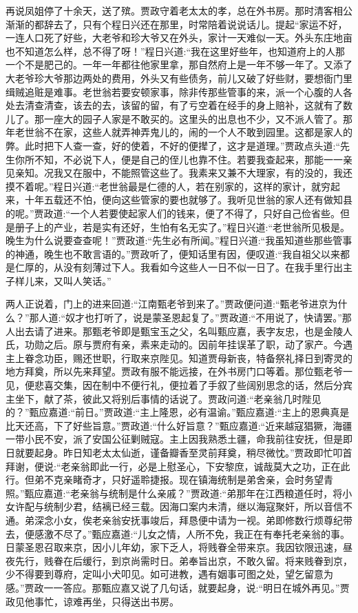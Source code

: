\begin{parag}
    再说凤姐停了十余天，送了殡。贾政守着老太太的孝，总在外书房。那时清客相公渐渐的都辞去了，只有个程日兴还在那里，时常陪着说说话儿。提起“家运不好，一连人口死了好些，大老爷和珍大爷又在外头，家计一天难似一天。外头东庄地亩也不知道怎么样，总不得了呀！”程日兴道:“我在这里好些年，也知道府上的人那一个不是肥己的。一年一年都往他家里拿，那自然府上是一年不够一年了。又添了大老爷珍大爷那边两处的费用，外头又有些债务，前儿又破了好些财，要想衙门里缉贼追赃是难事。老世翁若要安顿家事，除非传那些管事的来，派一个心腹的人各处去清查清查，该去的去，该留的留，有了亏空着在经手的身上赔补，这就有了数儿了。那一座大的园子人家是不敢买的。这里头的出息也不少，又不派人管了。那年老世翁不在家，这些人就弄神弄鬼儿的，闹的一个人不敢到园里。这都是家人的弊。此时把下人查一查，好的使着，不好的便撵了，这才是道理。”贾政点头道:“先生你所不知，不必说下人，便是自己的侄儿也靠不住。若要我查起来，那能一一亲见亲知。况我又在服中，不能照管这些了。我素来又兼不大理家，有的没的，我还摸不着呢。”程日兴道:“老世翁最是仁德的人，若在别家的，这样的家计，就穷起来，十年五载还不怕，便向这些管家的要也就够了。我听见世翁的家人还有做知县的呢。”贾政道:“一个人若要使起家人们的钱来，便了不得了，只好自己俭省些。但是册子上的产业，若是实有还好，生怕有名无实了。”程日兴道:“老世翁所见极是。晚生为什么说要查查呢！”贾政道:“先生必有所闻。”程日兴道:“我虽知道些那些管事的神通，晚生也不敢言语的。”贾政听了，便知话里有因，便叹道:“我自祖父以来都是仁厚的，从没有刻薄过下人。我看如今这些人一日不似一日了。在我手里行出主子样儿来，又叫人笑话。”
\end{parag}


\begin{parag}
    两人正说着，门上的进来回道:“江南甄老爷到来了。”贾政便问道:“甄老爷进京为什么？”那人道:“奴才也打听了，说是蒙圣恩起复了。”贾政道:“不用说了，快请罢。”那人出去请了进来。那甄老爷即是甄宝玉之父，名叫甄应嘉，表字友忠，也是金陵人氏，功勋之后。原与贾府有亲，素来走动的。因前年挂误革了职，动了家产。今遇主上眷念功臣，赐还世职，行取来京陛见。知道贾母新丧，特备祭礼择日到寄灵的地方拜奠，所以先来拜望。贾政有服不能远接，在外书房门口等着。那位甄老爷一见，便悲喜交集，因在制中不便行礼，便拉着了手叙了些阔别思念的话，然后分宾主坐下，献了茶，彼此又将别后事情的话说了。贾政问道:“老亲翁几时陛见的？”甄应嘉道:“前日。”贾政道:“主上隆恩，必有温谕。”甄应嘉道:“主上的恩典真是比天还高，下了好些旨意。”贾政道:“什么好旨意？”甄应嘉道:“近来越寇猖獗，海疆一带小民不安，派了安国公征剿贼寇。主上因我熟悉土疆，命我前往安抚，但是即日就要起身。昨日知老太太仙逝，谨备瓣香至灵前拜奠，稍尽微忱。”贾政即忙叩首拜谢，便说:“老亲翁即此一行，必是上慰圣心，下安黎庶，诚哉莫大之功，正在此行。但弟不克亲睹奇才，只好遥聆捷报。现在镇海统制是弟舍亲，会时务望青照。”甄应嘉道:“老亲翁与统制是什么亲戚？”贾政道:“弟那年在江西粮道任时，将小女许配与统制少君，结褵已经三载。因海口案内未清，继以海寇聚奸，所以音信不通。弟深念小女，俟老亲翁安抚事竣后，拜恳便中请为一视。弟即修数行烦尊纪带去，便感激不尽了。”甄应嘉道:“儿女之情，人所不免，我正在有奉托老亲翁的事。日蒙圣恩召取来京，因小儿年幼，家下乏人，将贱眷全带来京。我因钦限迅速，昼夜先行，贱眷在后缓行，到京尚需时日。弟奉旨出京，不敢久留。将来贱眷到京，少不得要到尊府，定叫小犬叩见。如可进教，遇有姻事可图之处，望乞留意为感。”贾政一一答应。那甄应嘉又说了几句话，就要起身，说:“明日在城外再见。”贾政见他事忙，谅难再坐，只得送出书房。
\end{parag}


